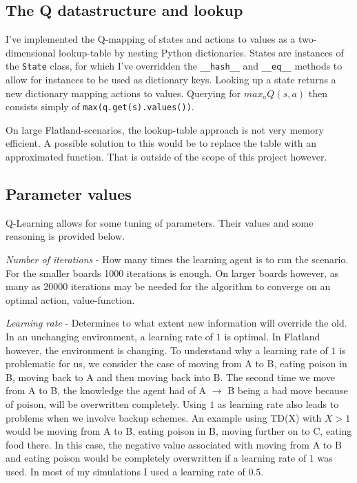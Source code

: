 \documentclass[twoside]{article}
\begin{document}
\begin{multicols}{2}
    \subsection{The Q datastructure and lookup}

    I've implemented the Q-mapping of states and actions to values as a two-dimensional lookup-table by nesting Python dictionaries.
    States are instances of the \texttt{State} class, for which I've overridden the \texttt{\_\_hash\_\_} and \texttt{\_\_eq\_\_} methods to allow for instances to be used as dictionary keys.
    Looking up a state returns a new dictionary mapping actions to values.
    Querying for $max_{a}Q(s, a)$ then consists simply of \texttt{max(q.get(s).values())}.

    On large Flatland-scenarios, the lookup-table approach is not very memory efficient.
    A possible solution to this would be to replace the table with an approximated function.
    That is outside of the scope of this project however.

    \subsection{Parameter values}

    Q-Learning allows for some tuning of parameters. Their values and some reasoning is provided below.

    \textit{Number of iterations} - How many times the learning agent is to run the scenario. 
    For the smaller boards 1000 iterations is enough. On larger boards however, as many as 20000 iterations may be needed for the algorithm to converge on an optimal action, value-function.

    \textit{Learning rate} - Determines to what extent new information will override the old.
    In an unchanging environment, a learning rate of $1$ is optimal.
    In Flatland however, the environment is changing.
    To understand why a learning rate of $1$ is problematic for us, we consider the case of moving from A to B, eating poison in B, moving back to A and then moving back into B.
    The second time we move from A to B, the knowledge the agent had of A $\rightarrow$ B being a bad move because of poison, will be overwritten completely.
    Using $1$ as learning rate also leads to problems when we involve backup schemes.
    An example using TD(X) with $X > 1$ would be moving from A to B, eating poison in B, moving further on to C, eating food there.
    In this case, the negative value associated with moving from A to B and eating poison would be completely overwritten if a learning rate of $1$ was used.
    In most of my simulations I used a learning rate of $0.5$.


\end{multicols}
\end{document}
